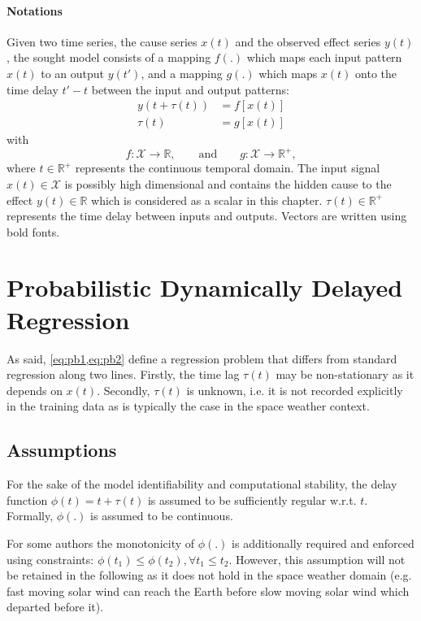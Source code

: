 \paragraph{Notations}
Given two time series, the cause series $x(t)$ and the observed effect series $y(t)$, the sought 
model consists of a mapping $f(.)$ which maps each input pattern $x(t)$ to an output $y(t')$, and a 
mapping $g(.)$ which maps $x(t)$ onto the time delay $t'-t$ between the input and output patterns:
%
\begin{align}
y(t + \tau(t)) & = f[x(t)]\label{eq:pb1}\\
\tau(t) & = g[x(t)]\label{eq:pb2} 
\end{align}
with
\[
f: \mathcal{X}  \rightarrow \mathbb{R},\qquad\text{and}\qquad
g: \mathcal{X}  \rightarrow \mathbb{R}^{+},
\]
where $t \in \mathbb{R}^{+}$ represents the continuous temporal domain. The input signal 
$x(t)\in \mathcal{X}$ is possibly high dimensional and contains the hidden cause to 
the effect $y(t)\in\mathbb{R}$ which is considered as a scalar in this chapter. 
$\tau(t)\in \mathbb{R}^+$ represents the time delay between inputs and outputs.
Vectors are written using bold fonts.

\section{Probabilistic Dynamically Delayed Regression}\label{sec:dtlrformulation}
As said, \cref{eq:pb1,eq:pb2} define a regression problem that differs from standard regression 
along two lines. Firstly, the time lag $\tau(t)$ may be non-stationary as it depends on $x(t)$. 
Secondly, $\tau(t)$ is unknown, i.e. it is not recorded explicitly in the training data as is 
typically the case in the space weather context. 

\subsection{Assumptions}

For the sake of the model identifiability and computational stability, the delay function 
$\phi(t) = t + \tau(t)$ is assumed to be sufficiently regular w.r.t. $t$. Formally, $\phi(.)$ 
is assumed to be continuous.

For some authors \citep{ZHOU2006195} the monotonicity of $\phi(.)$ is additionally required and 
enforced using constraints: $\phi(t_1) \leq \phi(t_2), \forall t_1 \leq t_2$. However, this 
assumption will not be retained in the following as it does not hold in the space weather domain 
(e.g. fast moving solar wind can reach the Earth before slow moving solar wind which departed 
before it). 

